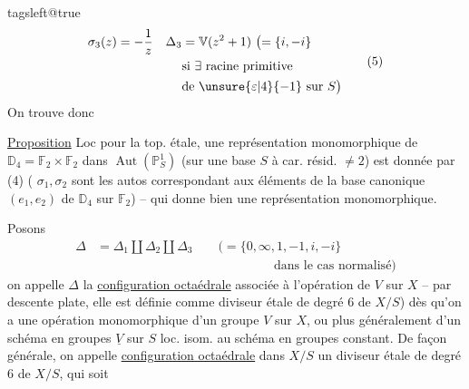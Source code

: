 \begingroup\csname tagsleft@true\endcsname
\[
\begin{aligned}
\sigma_3(z)&=-\frac1z & \Delta_3&=\mathbb V(z^2+1)\ \bigl(=\{i,-i\}\\
&&&\text{si }\exists\ \text{racine primitive}\\
&&&\text{de }\unsure{\varepsilon|4}{-1}\ \text{sur }S\bigr)
\end{aligned} \tag*{(5)}
\]
On trouve donc

\uline{Proposition} Loc pour la top. étale, une représentation monomorphique de \(\mathbb D_4=\mathbb F_2\times\mathbb F_2\) dans \(\operatorname{Aut}(\mathbb P^1_S)\) (sur une base \(S\) à car. résid. \(\ne2\)) est donnée par (4) ( \(\sigma_1,\sigma_2\) sont les autos correspondant aux éléments de la base canonique \((e_1,e_2)\) de \(\mathbb D_4\) sur \(\mathbb F_2\)) -- qui donne bien une représentation monomorphique.

Posons
\[
\begin{aligned}
\Delta&=\Delta_1\amalg\Delta_2\amalg\Delta_3\qquad\bigl(=\{0,\infty,1,-1,i,-i\}\\
&\hspace{14em}\text{dans le cas normalisé}\bigr)
\end{aligned} \tag*{(6)}
\]
on appelle \(\Delta\) la \uline{configuration octaédrale} associée à l'opération de \(V\) sur  \(X\) -- par descente plate, elle est définie comme diviseur étale de degré \(6\) de \(X/S\)) dès qu'on a une opération monomorphique  d'un groupe \(V\)  sur \(X\), ou plus généralement d'un schéma en groupes \(\underline V\) sur \(S\) loc. isom. au schéma en groupes constant.  De façon générale, on appelle \uline{configuration octaédrale} dans \(X/S\) un diviseur étale de degré \(6\) de \(X/S\), qui soit
\endgroup
